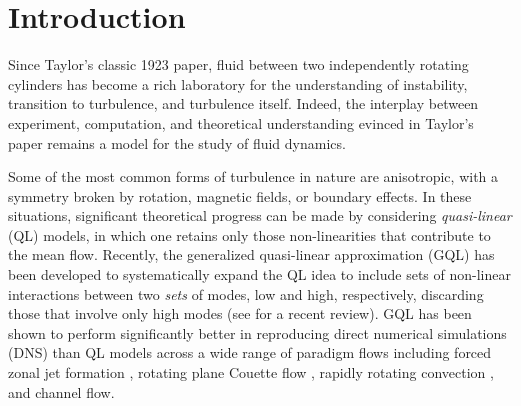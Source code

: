 \documentclass[openacc]{rstransa}%
\begin{document}
\section{Introduction}
\label{sec:intro}
Since Taylor's classic 1923 paper\cite{1923RSPTA.223..289T}, fluid between two independently rotating cylinders has become a rich laboratory for the understanding of instability, transition to turbulence, and turbulence itself. Indeed, the interplay between experiment, computation, and theoretical understanding evinced in Taylor's paper remains a model for the study of fluid dynamics.

Some of the most common forms of turbulence in nature are anisotropic, with a symmetry broken by rotation, magnetic fields, or boundary effects. In these situations, significant theoretical progress can be made by considering \emph{quasi-linear} (QL) models, in which one retains only those non-linearities that contribute to the mean flow. Recently, the generalized quasi-linear approximation (GQL) has been developed to systematically expand the QL idea to include sets of non-linear interactions between two \emph{sets} of modes, low and high, respectively, discarding those that involve only high modes (see \cite{2022arXiv220505513M} for a recent review). GQL has been shown to perform significantly better in reproducing direct numerical simulations (DNS) than QL models across a wide range of paradigm flows including forced zonal jet formation \cite{2016PhRvL.116u4501M}, rotating plane Couette flow \cite{2017JFM...810..412T}, rapidly rotating convection \cite{2018RSPSA.47480422T}, and channel flow\cite{2019Kellam}.
\end{document}
